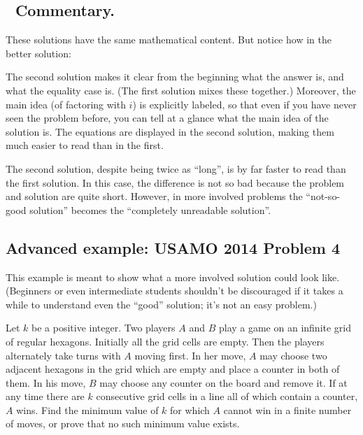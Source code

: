\documentclass[11pt]{scrartcl}
\begin{document}
\subsection*{💬 Commentary.}
These solutions have the same mathematical content.
But notice how in the better solution:
\begin{itemize}
  \ii The second solution makes it clear
  from the beginning what the answer is, and what the equality case is.
  (The first solution mixes these together.)
  \ii Moreover, the main idea (of factoring with $i$) is explicitly labeled,
  so that even if you have never seen the problem before,
  you can tell at a glance what the main idea of the solution is.
  \ii The equations are displayed in the second solution,
  making them much easier to read than in the first.
\end{itemize}
The second solution, despite being twice as ``long'',
is by far faster to read than the first solution.
In this case, the difference is not so bad because the
problem and solution are quite short.
However, in more involved problems the ``not-so-good solution''
becomes the ``completely unreadable solution''.


\subsection{Advanced example: USAMO 2014 Problem 4}
This example is meant to show what a more involved solution could look like.
(Beginners or even intermediate students shouldn't be discouraged
if it takes a while to understand even the ``good'' solution; it's not an easy problem.)

\begin{example}
  Let $k$ be a positive integer.
  Two players $A$ and $B$ play a game on an infinite grid of regular hexagons.
  Initially all the grid cells are empty.
  Then the players alternately take turns with $A$ moving first.
  In her move, $A$ may choose two adjacent hexagons in the grid
  which are empty and place a counter in both of them.
  In his move, $B$ may choose any counter on the board and remove it.
  If at any time there are $k$ consecutive grid cells
  in a line all of which contain a counter, $A$ wins.
  Find the minimum value of $k$ for which $A$ cannot
  win in a finite number of moves, or prove that no such minimum value exists.
\end{example}
\end{document}

